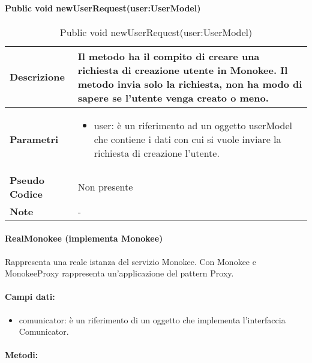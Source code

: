\paragraph{Public void newUserRequest(user:UserModel)}
\begin{center}
    \begin{longtable}{|p{3cm}|p{9cm}|}%
    \caption{Public void newUserRequest(user:UserModel)}
    \endfirsthead
    \endhead
    \hline
    \textbf{Descrizione} & Il metodo ha il compito di creare una richiesta di creazione utente in Monokee. Il metodo invia solo la richiesta, non ha modo di sapere se l’utente venga creato o meno.\\
    \hline
    \textbf{Parametri} &      
    \begin{itemize}
        \item user: è un riferimento ad un oggetto userModel che contiene i dati con cui si vuole inviare la richiesta di creazione l’utente.
    \end{itemize}
    \\
    \hline
    \textbf{Pseudo Codice} & 
    Non presente
    \\
    \hline
    \textbf{Note} & 
    -
    \\
    \hline
    \end{longtable}
    \end{center}



\paragraph{RealMonokee (implementa Monokee)}
Rappresenta una reale istanza del servizio Monokee. Con Monokee e MonokeeProxy rappresenta un’applicazione del pattern Proxy.
\paragraph{Campi dati:}
\begin{itemize}
    \item comunicator: è un riferimento di un oggetto che implementa l’interfaccia Comunicator.
\end{itemize}
\paragraph{Metodi:}




